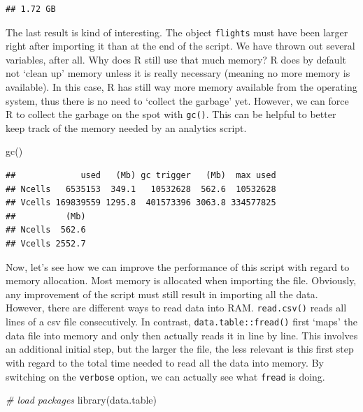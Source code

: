 \documentclass[
  12pt,
]{style/krantz}
\newenvironment{Shaded}{\begin{snugshade}}{\end{snugshade}}
\newcommand{\CommentTok}[1]{\textcolor[rgb]{0.56,0.35,0.01}{\textit{#1}}}
\newcommand{\FunctionTok}[1]{\textcolor[rgb]{0.00,0.00,0.00}{#1}}
\newcommand{\NormalTok}[1]{#1}
\begin{document}
\begin{verbatim}
## 1.72 GB
\end{verbatim}

The last result is kind of interesting. The object \texttt{flights} must have been larger right after importing it than at the end of the script. We have thrown out several variables, after all. Why does R still use that much memory? R does by default not `clean up' memory unless it is really necessary (meaning no more memory is available). In this case, R has still way more memory available from the operating system, thus there is no need to `collect the garbage' yet. However, we can force R to collect the garbage on the spot with \texttt{gc()}. This can be helpful to better keep track of the memory needed by an analytics script.

\begin{Shaded}
\begin{Highlighting}[]
\FunctionTok{gc}\NormalTok{()}
\end{Highlighting}
\end{Shaded}

\begin{verbatim}
##             used   (Mb) gc trigger   (Mb)  max used
## Ncells   6535153  349.1   10532628  562.6  10532628
## Vcells 169839559 1295.8  401573396 3063.8 334577825
##          (Mb)
## Ncells  562.6
## Vcells 2552.7
\end{verbatim}

Now, let's see how we can improve the performance of this script with regard to memory allocation. Most memory is allocated when importing the file. Obviously, any improvement of the script must still result in importing all the data. However, there are different ways to read data into RAM. \texttt{read.csv()} reads all lines of a csv file consecutively. In contrast, \texttt{data.table::fread()} first `maps' the data file into memory and only then actually reads it in line by line. This involves an additional initial step, but the larger the file, the less relevant is this first step with regard to the total time needed to read all the data into memory. By switching on the \texttt{verbose} option, we can actually see what \texttt{fread} is doing.

\begin{Shaded}
\begin{Highlighting}[]
\CommentTok{\# load packages}
\FunctionTok{library}\NormalTok{(data.table)}
\end{Highlighting}
\end{Shaded}
\end{document}
